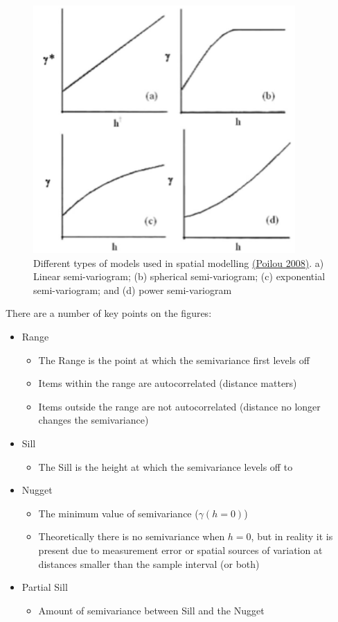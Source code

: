\documentclass{article}
\begin{document}
\begin{figure}[h]
    \centering
    \label{Kriging variogram model shapes}
    \caption{Different types of models used in spatial modelling \href{https://www.publichealth.columbia.edu/research/population-health-methods/kriging-interpolation}{(Poilou 2008)}. a) Linear semi-variogram; (b) spherical semi-variogram; (c) exponential semi-variogram; and (d) power semi-variogram}
    \includegraphics[width=10cm]{semivariogram-models.png}
\end{figure} 

There are a number of key points on the figures:

\begin{itemize}
    \item Range
    \begin{itemize}
        \item The Range is the point at which the semivariance first levels off
        \item Items within the range are autocorrelated (distance matters)
        \item Items outside the range are not autocorrelated (distance no longer changes the semivariance)
    \end{itemize}
    \item Sill 
    \begin{itemize}
        \item The Sill is the height at which the semivariance levels off to
    \end{itemize}
    \item Nugget
    \begin{itemize}
        \item The minimum value of semivariance ($\gamma (h = 0)$)
        \item Theoretically there is no semivariance when $h=0$, but in reality it is present due to measurement error or spatial sources of variation at distances smaller than the sample interval (or both)
    \end{itemize}
    \item Partial Sill
    \begin{itemize}
        \item Amount of semivariance between Sill and the Nugget
    \end{itemize}
\end{itemize}
\end{document}
